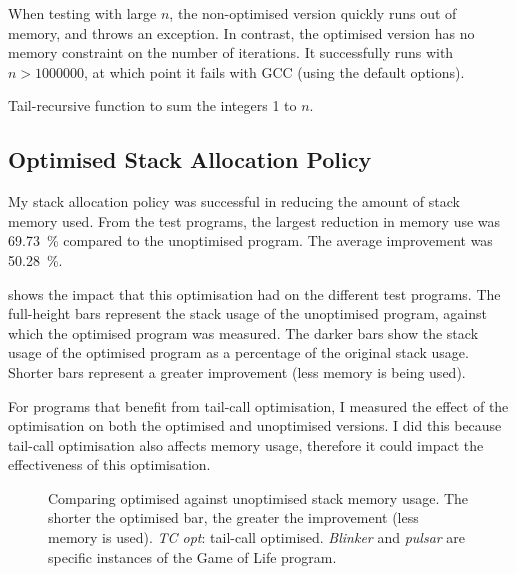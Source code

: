 \documentclass[00-main.tex]{subfiles}
\begin{document}
When testing with large $n$, the non-optimised version quickly runs out of memory, and throws an exception.
In contrast, the optimised version has no memory constraint on the number of iterations.
It successfully runs with $n > \num{1000000}$, at which point it fails with GCC (using the default options).

\begin{listing}[t]
\caption{Tail-recursive function to sum the integers 1 to $n$.\medskip}
\label{lst:tail-recursive sum}
\end{listing}


\subsection{Optimised Stack Allocation Policy}\label{sec:eval:optimised stack allocation}

My stack allocation policy was successful in reducing the amount of stack memory used.
From the test programs, the largest reduction in memory use was \SI{69.73}{\percent} compared to the unoptimised program.
The average improvement was \SI{50.28}{\percent}.

 shows the impact that this optimisation had on the different test programs.
The full-height bars represent the stack usage of the unoptimised program, against which the optimised program was measured.
The darker bars show the stack usage of the optimised program as a percentage of the original stack usage.
Shorter bars represent a greater improvement (less memory is being used).

For programs that benefit from tail-call optimisation, I measured the effect of the optimisation on both the optimised and unoptimised versions.
I did this because tail-call optimisation also affects memory usage, therefore it could impact the effectiveness of this optimisation.

\begin{figure}[p]
  \centering
  \caption{Comparing optimised against unoptimised stack memory usage. The shorter the optimised bar, the greater the improvement (less memory is used). \emph{TC opt}: tail-call optimised. \emph{Blinker} and \emph{pulsar} are specific instances of the Game of Life program.}%
  \label{fig:comparing stack usage optimisation across programs}
\end{figure}
\end{document}
